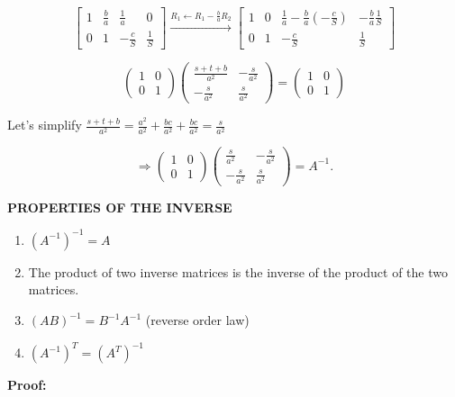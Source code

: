 \[\begin{bmatrix}
1 & \frac{b}{a} & \frac{1}{a} & 0 \\
0 & 1 & -\frac{c}{S} & \frac{1}{S}
\end{bmatrix} \xrightarrow{R_1 \leftarrow R_1 - \frac{b}{a}R_2}
\begin{bmatrix}
1 & 0 & \frac{1}{a} - \frac{b}{a}\left(-\frac{c}{S}\right) & -\frac{b}{a}\frac{1}{S} \\
0 & 1 & -\frac{c}{S} & \frac{1}{S}
\end{bmatrix}\]

\begin{equation*}
\begin{pmatrix}
1 & 0 \\
0 & 1
\end{pmatrix}
\begin{pmatrix}
\frac{s+t+b}{a^2} & -\frac{s}{a^2} \\
-\frac{s}{a^2} & \frac{s}{a^2}
\end{pmatrix}
=
\begin{pmatrix}
1 & 0 \\
0 & 1
\end{pmatrix}
\end{equation*}

Let's simplify $\frac{s+t+b}{a^2} = \frac{a^2}{a^2} + \frac{bc}{a^2} + \frac{bc}{a^2} = \frac{s}{a^2}$

\begin{equation*}
\Rightarrow
\begin{pmatrix}
1 & 0 \\
0 & 1
\end{pmatrix}
\begin{pmatrix}
\frac{s}{a^2} & -\frac{s}{a^2} \\
-\frac{s}{a^2} & \frac{s}{a^2}
\end{pmatrix}
= A^{-1}.
\end{equation*}

\textbf{PROPERTIES OF THE INVERSE}

\begin{enumerate}
\item $(A^{-1})^{-1} = A$
\item The product of two inverse matrices is the inverse of the product of the two matrices.
\item $(AB)^{-1} = B^{-1}A^{-1}$ \quad (reverse order law)
\item $(A^{-1})^T = (A^T)^{-1}$
\end{enumerate}

\textbf{Proof:}

